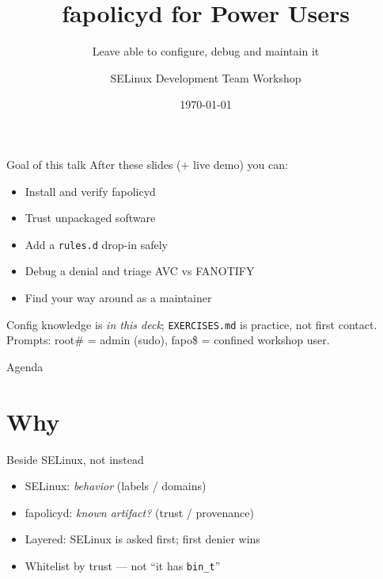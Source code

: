 \documentclass[aspectratio=169,11pt]{beamer}
\title{fapolicyd for Power Users}
\subtitle{Leave able to configure, debug and maintain it}
\author{SELinux Development Team Workshop}
\date{\today}
\newcommand{\rootp}{\textcolor{rootc}{root\#}}
\newcommand{\fapop}{\textcolor{fapoc}{fapo\$}}
\begin{document}
\begin{frame}
  \titlepage
\end{frame}

\begin{frame}{Goal of this talk}
  After these slides (+ live demo) you can:
  \begin{itemize}
    \item Install and verify fapolicyd
    \item Trust unpackaged software
    \item Add a \texttt{rules.d} drop-in safely
    \item Debug a denial and triage AVC vs FANOTIFY
    \item Find your way around as a maintainer
  \end{itemize}
  \vspace{0.6em}
  {\small Config knowledge is \emph{in this deck}; \texttt{EXERCISES.md}
  is practice, not first contact.\\
  Prompts: \rootp{} = admin (sudo), \fapop{} = confined workshop user.}
\end{frame}

\begin{frame}{Agenda}
  \tableofcontents
\end{frame}

\section{Why}

\begin{frame}{Beside SELinux, not instead}
  \begin{itemize}
    \item SELinux: \emph{behavior} (labels / domains)
    \item fapolicyd: \emph{known artifact?} (trust / provenance)
    \item Layered: SELinux is asked first; first denier wins
    \item Whitelist by trust --- not ``it has \texttt{bin\_t}''
  \end{itemize}
\end{frame}
\end{document}
